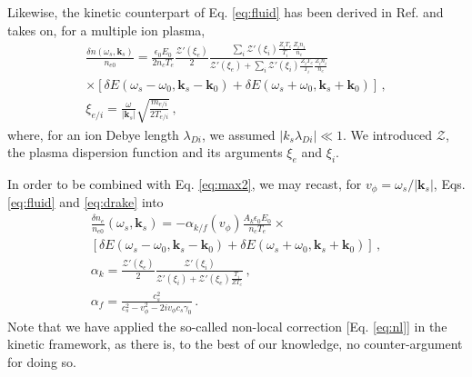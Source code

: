 \documentclass[
 reprint,
 amsmath,amssymb,
 aps,
]{revtex4-1}
\begin{document}
Likewise, the kinetic counterpart of Eq. \eqref{eq:fluid} has been derived in Ref. \cite[]{POF_Drake_1973} and    takes on, for a multiple ion plasma, 
\begin{align}
 \frac{ \delta n (\omega_s, \mathbf{k}_s ) }{n_{e0}}  =   \frac{ \epsilon_0  E_0 }{ 2n_c T_e } 
 \frac{\mathcal{Z}'( \xi_e) }{2}
 \frac{\sum_i\mathcal{Z}'( \xi_i)\frac{  Z_iT_e}{ T_i }\frac{  Z_in_i}{ n_e }   }{  \mathcal{Z}'( \xi_e)+ \sum_i\mathcal{Z}'( \xi_i)\frac{  Z_iT_e}{ T_i }\frac{ Z_i n_i}{ n_e }  }
\nonumber\\  \times \left[\delta E(\omega_s-\omega_0, \mathbf{k}_s-\mathbf{k}_0) +\delta E(\omega_s+\omega_0, \mathbf{k}_s+\mathbf{k}_0) \right] %
   \, ,\label{eq:drake}\\
   \xi_{e/i} = \frac{   \omega }{   \vert\mathbf{k}_s\vert }  \sqrt{ \frac{ m_{e/i } }{ 2T_{e/i }}  }  \label{eq:xi} \, , 
 \end{align}
 where, for an ion Debye length $\lambda_{Di}$, we assumed $\vert k_s \lambda_{Di} \vert \ll 1$. 
We introduced $\mathcal{Z}$, the plasma dispersion function \cite{Fried_Gell-Mann_1960} and its arguments $\xi_{e } $ and $\xi_{i }$. %

In order to be combined with Eq. \eqref{eq:max2}, we may recast, for $v_\phi = \omega_s/\vert \mathbf{k}_s\vert $, Eqs. \eqref{eq:fluid} and  \eqref{eq:drake} into 
\begin{align}
   \frac{\delta n_e }{n_{e0}}(\omega_s,\mathbf{k}_s) = -\alpha_{k/f}(v_\phi) \frac{A_k\epsilon_0 E_0}{n_c T_e}\times \nonumber\\ \left[\delta E(\omega_s-\omega_0, \mathbf{k}_s-\mathbf{k}_0) +\delta E(\omega_s+\omega_0, \mathbf{k}_s+\mathbf{k}_0) \right] \, ,\label{eq:fd} \\
   \alpha_k  = \frac{\mathcal{Z}'( \xi_e) }{2}\frac{\mathcal{Z}'( \xi_i)   }{  \mathcal{Z}'( \xi_i) +\mathcal{Z}'( \xi_e)\frac{ T_i }{  ZT_e} }\, ,\label{eq:alphak} \\
   \alpha_f = \frac{c_s^2}{ c_s^2-v_\phi^2 -2iv_\phi c_s \gamma_0}\, .\label{eq:alphaf}
\end{align}
Note that we have  applied the so-called non-local correction [Eq. \eqref{eq:nl}] in the kinetic framework, as there is, to the best of our knowledge,  no counter-argument for doing so. 
\end{document}
